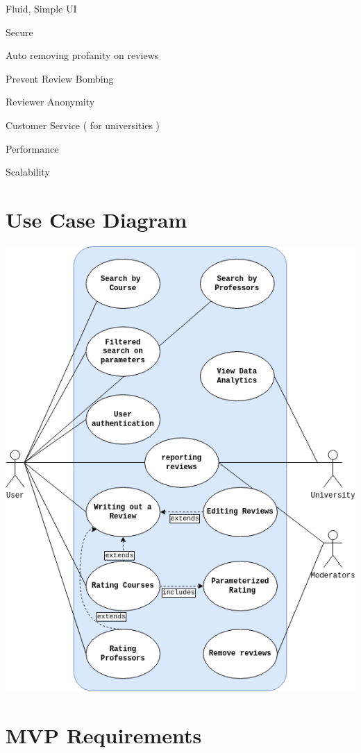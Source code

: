\documentclass{article}
\begin{document}
	\quad Fluid, Simple UI

	\quad Secure

	\quad Auto removing profanity on reviews

	\quad Prevent Review Bombing

	\quad Reviewer Anonymity

	\quad Customer Service ( for universities )

	\quad Performance

	\quad Scalability

\section{Use Case Diagram} 

\begin{center}
	\includegraphics[scale=0.5]{../requirements_specification/USECASE.drawio.png}	
\end{center}

\section{MVP Requirements}
\end{document}
